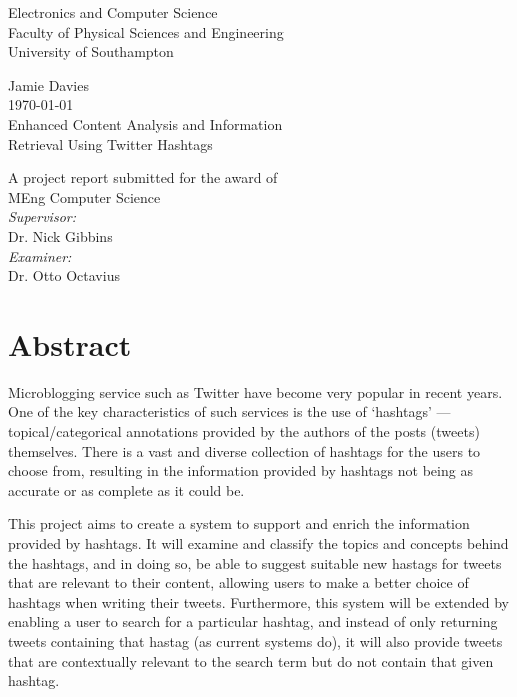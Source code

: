 \documentclass[12pt,a4paper]{article}
\begin{document}
\begin{titlepage}
\center
\vspace*{3cm}

{\Large
    Electronics and Computer Science\\
    Faculty of Physical Sciences and Engineering\\
    University of Southampton\\[1cm]
}

Jamie Davies\\
\today\\[1cm]

{\large
    Enhanced Content Analysis and Information\\
    Retrieval Using Twitter Hashtags\\[1cm]
}

A project report submitted for the award of\\
MEng Computer Science\\[1cm]

\emph{Supervisor:}\\
Dr. Nick Gibbins\\[0.5cm]

\emph{Examiner:}\\
Dr. Otto Octavius\\


\vfill
\end{titlepage}

\setcounter{secnumdepth}{0}
\section{Abstract}
Microblogging service such as Twitter have become very popular in recent years. One of the key characteristics of such services is the use of `hashtags' --- topical/categorical annotations provided by the authors of the posts (tweets) themselves. There is a vast and diverse collection of hashtags for the users to choose from, resulting in the information provided by hashtags not being as accurate or as complete as it could be.

This project aims to create a system to support and enrich the information provided by hashtags. It will examine and classify the topics and concepts behind the hashtags, and in doing so, be able to suggest suitable new hastags for tweets that are relevant to their content, allowing users to make a better choice of hashtags when writing their tweets. Furthermore, this system will be extended by enabling a user to search for a particular hashtag, and instead of only returning tweets containing that hastag (as current systems do), it will also provide tweets that are contextually relevant to the search term but do not contain that given hashtag.
\pagebreak
\end{document}
